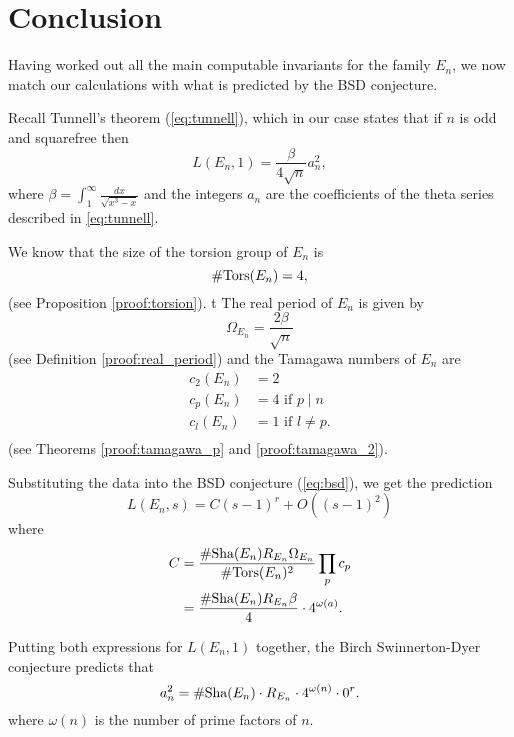 \documentclass[12pt, a4paper]{report}
\begin{document}
\newpage

\chapter{Conclusion}
Having worked out all the main computable invariants
for the family $E_n$, we now match our calculations with what is predicted
by the BSD conjecture. 

Recall Tunnell's theorem (\autoref{eq:tunnell}), which in our case states that
if $n$ is odd and squarefree then
\[L(E_n,1) = \frac{\beta}{4\sqrt{n}}a_n^2,\]
where $\beta = \int_1^\infty \frac{dx}{\sqrt{x^3-x}}$ and the integers $a_n$
are the coefficients of the theta series described in \autoref{eq:tunnell}.

We know that the size of the torsion group of $E_n$ is 
\begin{equation*}
    \#{\text{\normalfont Tors}}(E_n) = 4,
  \end{equation*}
  (see Proposition \autoref{proof:torsion}). t
  The real period of $E_n$ is given by {}
\begin{equation*}
  \Omega_{E_n} = \frac{2\beta}{\sqrt{n}} 
\end{equation*}
(see Definition \autoref{proof:real_period}) and the Tamagawa numbers of $E_n$ are
\begin{equation*}
  \begin{split}
    c_2(E_n) &= 2 \\
    c_p(E_n) &= 4 \text{ if } p \mid n \\
    c_l(E_n) &= 1 \text{ if } l \neq p. \\
  \end{split}
\end{equation*}
(see Theorems \autoref{proof:tamagawa_p} and \autoref{proof:tamagawa_2}).

Substituting the data into the BSD conjecture (\autoref{eq:bsd}), we get the prediction
\[
  L(E_n,s) = C(s-1)^r + O((s-1)^2)
\]
where
\begin{equation*}
  \begin{split}
    C &=
    \frac{\# \text{\normalfont Sha}(E_n) R_{E_n} \Omega_{E_n}}{\# {\text{\normalfont Tors}}(E_n)^2}
    \prod\limits_p c_p \\
    &= \frac{\# \text{\normalfont Sha}(E_n) R_{E_n} \beta}{4} \cdot 4^{\omega(a)}.
  \end{split}
\end{equation*}

Putting both expressions for $L(E_n, 1)$ together, the Birch Swinnerton-Dyer conjecture
predicts that 
\begin{equation} \label{mainpred} 
  a_n^2 = \#\text{\normalfont Sha}(E_n) \cdot R_{E_n}\cdot 4^{\omega(n)} \cdot 0^r.
\end{equation}
where $\omega(n)$ is the number of prime factors of $n$.
\end{document}
